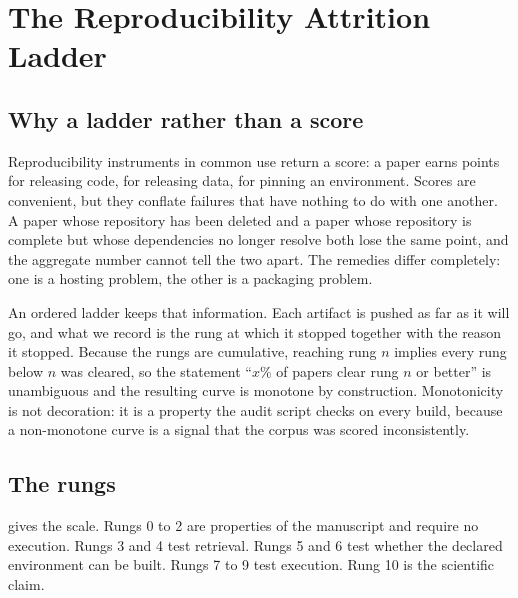 \section{The Reproducibility Attrition Ladder}\label{sec:ladder}

\subsection{Why a ladder rather than a score}\label{sec:why_ladder}

Reproducibility instruments in common use return a score: a paper earns points
for releasing code, for releasing data, for pinning an environment. Scores are
convenient, but they conflate failures that have nothing to do with one another.
A paper whose repository has been deleted and a paper whose repository is
complete but whose dependencies no longer resolve both lose the same point, and
the aggregate number cannot tell the two apart. The remedies differ completely:
one is a hosting problem, the other is a packaging problem.

An ordered ladder keeps that information. Each artifact is pushed as far as it
will go, and what we record is the rung at which it stopped together with the
reason it stopped. Because the rungs are cumulative, reaching rung $n$ implies
every rung below $n$ was cleared, so the statement ``$x\%$ of papers clear rung
$n$ or better'' is unambiguous and the resulting curve is monotone by
construction. Monotonicity is not decoration: it is a property the audit script
checks on every build, because a non-monotone curve is a signal that the corpus
was scored inconsistently.

\subsection{The rungs}\label{sec:rungs}

 gives the scale. Rungs 0 to 2 are properties of the manuscript
and require no execution. Rungs 3 and 4 test retrieval. Rungs 5 and 6 test
whether the declared environment can be built. Rungs 7 to 9 test execution.
Rung 10 is the scientific claim.

